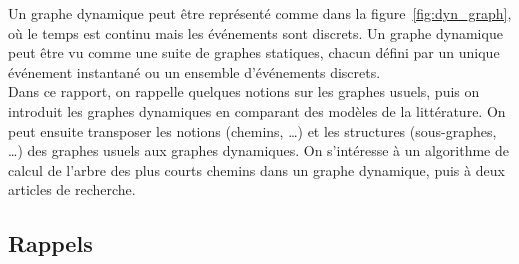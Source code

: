 \documentclass[12pt,a4paper]{article}
\begin{document}
Un graphe dynamique peut être représenté comme dans la
figure~\ref{fig:dyn_graph}, où le temps est continu mais les
événements sont discrets. Un graphe dynamique peut être vu comme une
suite de graphes statiques, chacun défini par un unique événement
instantané ou un ensemble d'événements discrets.\\

Dans ce rapport, on rappelle quelques notions sur les graphes usuels,
puis on introduit les graphes dynamiques en comparant des modèles de
la littérature. On peut ensuite transposer les notions (chemins, …)
et les structures (sous-graphes, …) des graphes usuels aux graphes
dynamiques. On s'intéresse à un algorithme de calcul de l'arbre des
plus courts chemins dans un graphe dynamique, puis à deux articles de
recherche.

\subsection{Rappels}
\end{document}
